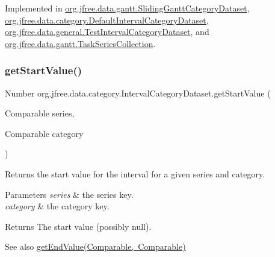 Implemented in \mbox{\hyperlink{classorg_1_1jfree_1_1data_1_1gantt_1_1_sliding_gantt_category_dataset_af0c6faccd8c5771ee5d994691b836296}{org.\+jfree.\+data.\+gantt.\+Sliding\+Gantt\+Category\+Dataset}}, \mbox{\hyperlink{classorg_1_1jfree_1_1data_1_1category_1_1_default_interval_category_dataset_a784e915bf76954a434bf44f587fcb29b}{org.\+jfree.\+data.\+category.\+Default\+Interval\+Category\+Dataset}}, \mbox{\hyperlink{classorg_1_1jfree_1_1data_1_1general_1_1_test_interval_category_dataset_a53688ff9ac8176c9262fffe32280f470}{org.\+jfree.\+data.\+general.\+Test\+Interval\+Category\+Dataset}}, and \mbox{\hyperlink{classorg_1_1jfree_1_1data_1_1gantt_1_1_task_series_collection_a99c30250fe009aadb13b6f92e35e7d49}{org.\+jfree.\+data.\+gantt.\+Task\+Series\+Collection}}.

\mbox{\label{interfaceorg_1_1jfree_1_1data_1_1category_1_1_interval_category_dataset_aec932dc7f50bf72be26002494a266e2e}} 
\subsubsection{\texorpdfstring{get\+Start\+Value()}{getStartValue()}\hspace{0.1cm}{\footnotesize\ttfamily [2/2]}}
{\footnotesize\ttfamily Number org.\+jfree.\+data.\+category.\+Interval\+Category\+Dataset.\+get\+Start\+Value (\begin{DoxyParamCaption}\item[{Comparable}]{series,  }\item[{Comparable}]{category }\end{DoxyParamCaption})}

Returns the start value for the interval for a given series and category.


\begin{DoxyParams}{Parameters}
{\em series} & the series key. \\
\hline
{\em category} & the category key.\\
\hline
\end{DoxyParams}
\begin{DoxyReturn}{Returns}
The start value (possibly {\ttfamily null}).
\end{DoxyReturn}
\begin{DoxySeeAlso}{See also}
\mbox{\hyperlink{interfaceorg_1_1jfree_1_1data_1_1category_1_1_interval_category_dataset_a2801c0f15eab2373ff828698f768a4b5}{get\+End\+Value(\+Comparable, Comparable)}} 
\end{DoxySeeAlso}


